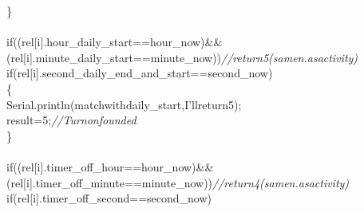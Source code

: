 \documentclass[a4paper, 12pt]{article}
\newcommand\SPC{\hspace*{0.6em}}
\newcommand\QOT{\mbox{\char 34}}
\newcommand{\CppAComment}[1]{\textit{\textcolor[rgb]{0.2,0.4,1}{#1}}}
\newcommand{\CppAIdentifier}[1]{\textcolor[rgb]{0,1,0}{#1}}
\newcommand{\CppANumber}[1]{\textcolor[rgb]{0,0,1}{#1}}
\newcommand{\CppAReservedWord}[1]{\textcolor[rgb]{0,0.5,0}{#1}}
\newcommand{\CppASpace}[1]{\textcolor[rgb]{1,1,1}{\colorbox[rgb]{0,0,0}{#1}}}
\newcommand{\CppAString}[1]{\textcolor[rgb]{0.76,0.76,0.76}{#1}}
\newcommand{\CppASymbol}[1]{\textcolor[rgb]{1,0,0}{#1}}
\begin{document}
\begin{ttfamily}
\CppASpace{\SPC \SPC \SPC \SPC \SPC \SPC }\CppASymbol{\}}\\
\CppASpace{\SPC }\\
\CppASpace{\SPC \SPC \SPC }\CppAReservedWord{if}\CppASpace{\SPC }\CppASymbol{(}\CppASpace{\SPC }\CppASymbol{(}\CppAIdentifier{rel}\CppASymbol{[}\CppAIdentifier{i}\CppASymbol{]}\CppASymbol{.}\CppAIdentifier{hour\_daily\_start}\CppASymbol{==}\CppAIdentifier{hour\_now}\CppASymbol{)}\CppASpace{\SPC }\CppASymbol{\&\&}\CppASpace{\SPC }\CppASymbol{(}\CppAIdentifier{rel}\CppASymbol{[}\CppAIdentifier{i}\CppASymbol{]}\CppASymbol{.}\CppAIdentifier{minute\_daily\_start}\CppASymbol{==}\CppAIdentifier{minute\_now}\CppASymbol{)}\CppASymbol{)}\CppASpace{\SPC }\CppAComment{//return\SPC 5\SPC (same\SPC n.\SPC as\SPC activity)}\\
\CppASpace{\SPC \SPC \SPC \SPC \SPC \SPC }\CppAReservedWord{if}\CppASymbol{(}\CppASpace{\SPC }\CppAIdentifier{rel}\CppASymbol{[}\CppAIdentifier{i}\CppASymbol{]}\CppASymbol{.}\CppAIdentifier{second\_daily\_end\_and\_start}\CppASymbol{==}\CppAIdentifier{second\_now}\CppASpace{\SPC }\CppASymbol{)}\\
\CppASpace{\SPC \SPC \SPC \SPC \SPC \SPC }\CppASymbol{\{}\\
\CppASpace{\SPC \SPC \SPC \SPC \SPC \SPC }\CppAIdentifier{Serial}\CppASymbol{.}\CppAIdentifier{println}\CppASymbol{(}\CppAString{\QOT \SPC match\SPC with\SPC daily\_start,\SPC I'll\SPC return\SPC 5\QOT }\CppASymbol{)}\CppASymbol{;}\\
\CppASpace{\SPC \SPC \SPC \SPC \SPC \SPC }\CppAIdentifier{result}\CppASymbol{=}\CppANumber{5}\CppASymbol{;}\CppASpace{\SPC }\CppAComment{//Turn\SPC on\SPC founded}\\
\CppASpace{\SPC \SPC \SPC \SPC \SPC \SPC }\CppASymbol{\}}\\
\CppASpace{\SPC \SPC \SPC }\\
\CppASpace{\SPC \SPC \SPC }\CppAReservedWord{if}\CppASpace{\SPC }\CppASymbol{(}\CppASpace{\SPC }\CppASymbol{(}\CppAIdentifier{rel}\CppASymbol{[}\CppAIdentifier{i}\CppASymbol{]}\CppASymbol{.}\CppAIdentifier{timer\_off\_hour}\CppASymbol{==}\CppAIdentifier{hour\_now}\CppASymbol{)}\CppASpace{\SPC }\CppASymbol{\&\&}\CppASpace{\SPC }\CppASymbol{(}\CppAIdentifier{rel}\CppASymbol{[}\CppAIdentifier{i}\CppASymbol{]}\CppASymbol{.}\CppAIdentifier{timer\_off\_minute}\CppASymbol{==}\CppAIdentifier{minute\_now}\CppASpace{\SPC }\CppASymbol{)}\CppASpace{\SPC }\CppASymbol{)}\CppASpace{\SPC }\CppAComment{//return\SPC 4\SPC (same\SPC n.\SPC as\SPC activity)}\\
\CppASpace{\SPC \SPC \SPC \SPC \SPC \SPC \SPC \SPC }\CppAReservedWord{if}\CppASpace{\SPC }\CppASymbol{(}\CppAIdentifier{rel}\CppASymbol{[}\CppAIdentifier{i}\CppASymbol{]}\CppASymbol{.}\CppAIdentifier{timer\_off\_second}\CppASymbol{==}\CppAIdentifier{second\_now}\CppASymbol{)}\\

\end{ttfamily}
\end{document}

